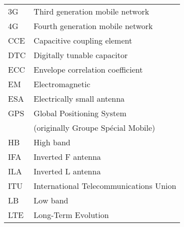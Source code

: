\begin{tabular}{ll}
3G          & Third generation mobile network \\
4G          & Fourth generation mobile network \\
CCE         & Capacitive coupling element\\
DTC         & Digitally tunable capacitor\\
ECC         & Envelope correlation coefficient\\
EM          & Electromagnetic\\
ESA         & Electrically small antenna\\
GPS         & Global Positioning System \\
            & (originally Groupe Spécial Mobile) \\
HB          & High band\\
IFA         & Inverted F antenna\\
ILA         & Inverted L antenna\\
ITU         & International Telecommunications Union \\
LB          & Low band\\
LTE         & Long-Term Evolution \\

\end{tabular}

